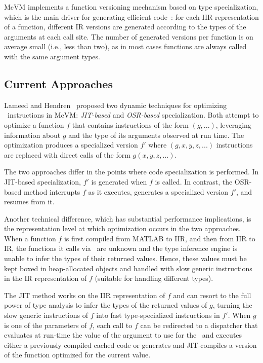 McVM implements a function versioning mechanism based on type specialization, which is the main driver for generating efficient code~\cite{Chevalier2010}: for each IIR representation of a function, different IR versions are generated according to the types of the arguments at each call site. The number of generated versions per function is on average small (i.e., less than two), as in most cases functions are always called with the same argument types.

\subsection{Current Approaches}
\label{ss:CS-prev-eval-sol}

Lameed and Hendren~\cite{Lameed2013b} proposed two dynamic techniques for optimizing \feval\ instructions in McVM: {\em JIT-based} and {\em OSR-based} specialization. Both attempt to optimize a function $f$ that contains instructions of the form \feval$(g,...)$, leveraging information about $g$ and the type of its arguments observed at run time. The optimization produces a specialized version $f'$ where \feval$(g,x,y,z,...)$ instructions are replaced with direct calls of the form $g(x,y,z,...)$. 

The two approaches differ in the points where code specialization is performed. In JIT-based specialization, $f'$ is generated when $f$ is called. In contrast, the OSR-based method interrupts $f$ as it executes, generates a specialized version $f'$, and resumes from it.  

Another technical difference, which has substantial performance implications, is the representation level at which optimization occurs in the two approaches. When a function $f$ is first compiled from MATLAB to IIR, and then from IIR to IR, the functions it calls via \feval\ are unknown and the type inference engine is unable to infer the types of their returned values. Hence, these values must be kept boxed in heap-allocated objects and handled with slow generic instructions in the IR representation of $f$ (suitable for handling different types).

The JIT method works on the IIR representation of $f$ and can resort to the full power of type analysis to infer the types of the returned values of $g$, turning the slow generic instructions of $f$ into fast type-specialized instructions in $f'$. When $g$ is one of the parameters of $f$, each call to $f$ can be redirected to a dispatcher that evaluates at run-time the value of the argument to use for the \feval\ and executes either a previously compiled cached code or generates and JIT-compiles a version of the function optimized for the current value.


